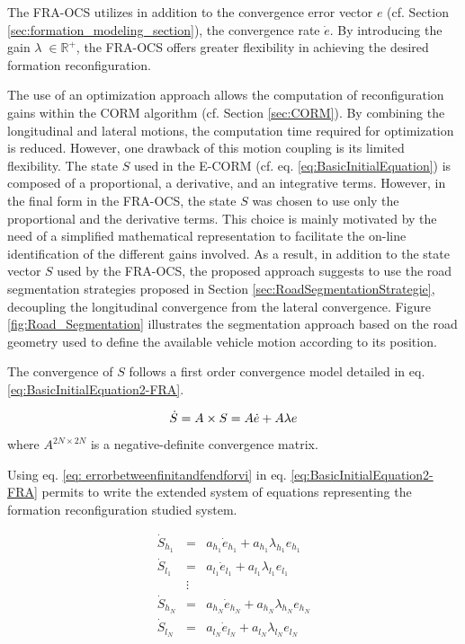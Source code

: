The FRA-OCS utilizes in addition to the convergence error vector $e$ (cf. Section \ref{sec:formation_modeling_section}), the convergence rate $\dot{e}$. By introducing the gain  $\lambda \;  \in \mathbb{R}^+ $, the FRA-OCS offers greater flexibility in achieving the desired formation reconfiguration. 

The use of an optimization approach allows the computation of reconfiguration gains within the CORM algorithm (cf. Section \ref{sec:CORM}). By combining the longitudinal and lateral motions, the computation time required for optimization is reduced. However, one drawback of this motion coupling is its limited flexibility. The state $S$ used in the E-CORM (cf. eq. \ref{eq:BasicInitialEquation}) is composed of a proportional, a derivative, and an integrative terms. However, in the final form in the FRA-OCS, the state $S$ was chosen to use only the proportional and the derivative terms. This choice is mainly motivated by the need of a simplified mathematical representation to facilitate the on-line identification of the different gains involved. As a result, in addition to the state vector $S$ used by the FRA-OCS, the proposed approach suggests to use the road segmentation strategies proposed in Section \ref{sec:RoadSegmentationStrategie}, decoupling the longitudinal convergence from the lateral convergence. Figure \ref{fig:Road_Segmentation} illustrates the segmentation approach based on the road geometry used to define the available vehicle motion according to its position. 

The convergence of $S$ follows a first order convergence model detailed in eq. \ref{eq:BasicInitialEquation2-FRA}. 

\begin{equation} \label{eq:BasicInitialEquation2-FRA}
    \dot{S} = A \times S = A \dot{e} +  A \lambda e  \\
\end{equation}
where $A^{2N\times 2N}$ is a negative-definite convergence matrix.


Using eq. \ref{eq: errorbetweenfinitandfendforvi} in eq. \ref{eq:BasicInitialEquation2-FRA} permits to write the extended system of equations representing the formation reconfiguration studied system. 

\begin{eqnarray} \label{eq:SystemOfBasicEquation_simplified}
  \dot{S}_{h_{1}} &=& a_{h_{1}}\dot{e}_{h_{1}} + a_{h_{1}}\lambda_{h_{1}}e_{h_{1}}\\ \nonumber
  \dot{S}_{l_{1}} &=& a_{l_{1}}\dot{e}_{l_{1}} + a_{l_{1}}\lambda_{l_{1}}e_{l_{1}}\\ \nonumber
        &\vdots& \\ \nonumber
  \dot{S}_{h_{N}} &=& a_{h_{N}}\dot{e}_{h_{N}} + a_{h_{N}}\lambda_{h_{N}}e_{h_{N}}\\ \nonumber
  \dot{S}_{l_{N}} &=& a_{l_{N}}\dot{e}_{l_{N}} + a_{l_{N}}\lambda_{l_{N}}e_{l_{N}}\\ \nonumber
\end{eqnarray}
                \vspace{-8.5mm}

